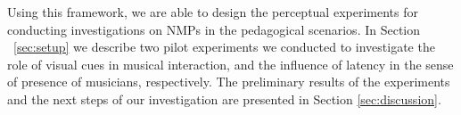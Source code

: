 Using this framework, we are able to design the perceptual experiments for conducting investigations on NMPs in the pedagogical scenarios. In Section ~\ref{sec:setup} we describe two pilot experiments we conducted to investigate the role of visual cues in musical interaction, and the influence of latency in the sense of presence of musicians, respectively. The preliminary results of the experiments and the next steps of our investigation are presented in  Section \ref{sec:discussion}.  








